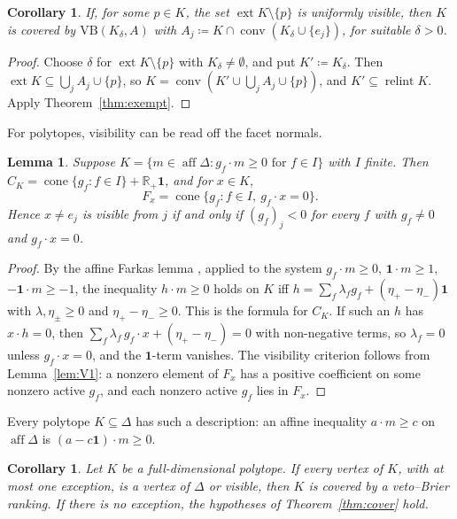 \documentclass[11pt]{article}
\newcommand{\R}{\mathbb{R}}
\newcommand{\one}{\mathbf{1}}
\newcommand{\VB}{\mathrm{VB}}
\DeclareMathOperator{\conv}{conv}
\DeclareMathOperator{\cone}{cone}
\DeclareMathOperator{\relint}{relint}
\DeclareMathOperator{\aff}{aff}
\DeclareMathOperator{\ext}{ext}
\theoremstyle{plain}
\newtheorem{lemma}[theorem]{Lemma}
\newtheorem{corollary}[theorem]{Corollary}
\theoremstyle{definition}
\theoremstyle{remark}
\begin{document}
\begin{corollary}\label{cor:exemptvis}
If, for some $p\in K$, the set $\ext K\setminus\{p\}$ is uniformly visible, then $K$ is
covered by $\VB(K_\delta,A)$ with $A_j\coloneqq K\cap\conv(K_\delta\cup\{e_j\})$, for
suitable $\delta>0$.
\end{corollary}

\begin{proof}
Choose $\delta$ for $\ext K\setminus\{p\}$ with $K_\delta\neq\emptyset$, and put
$K'\coloneqq K_\delta$. Then $\ext K\subseteq\bigcup_jA_j\cup\{p\}$, so
$K=\conv(K'\cup\bigcup_jA_j\cup\{p\})$, and $K'\subseteq\relint K$. Apply
Theorem~\ref{thm:exempt}.
\end{proof}

For polytopes, visibility can be read off the facet normals.

\begin{lemma}\label{lem:poly}
Suppose $K=\{m\in\aff\Delta:g_f\cdot m\ge0\text{ for }f\in I\}$ with $I$ finite. Then
$C_K=\cone\{g_f:f\in I\}+\R_+\one$, and for $x\in K$,
\[
  F_x=\cone\{g_f:f\in I,\ g_f\cdot x=0\}.
\]
Hence $x\neq e_j$ is visible from $j$ if and only if $(g_f)_j<0$ for every $f$ with
$g_f\neq0$ and $g_f\cdot x=0$.
\end{lemma}

\begin{proof}
By the affine Farkas lemma \cite[Cor.~7.1h]{Schrijver}, applied to the system $g_f\cdot
m\ge0$, $\one\cdot m\ge1$, $-\one\cdot m\ge-1$, the inequality $h\cdot m\ge0$ holds on
$K$ iff $h=\sum_f\lambda_fg_f+(\eta_+-\eta_-)\one$ with $\lambda,\eta_\pm\ge0$ and
$\eta_+-\eta_-\ge0$. This is the formula for $C_K$. If such an $h$ has $x\cdot h=0$, then
$\sum_f\lambda_f\,g_f\cdot x+(\eta_+-\eta_-)=0$ with non-negative terms, so $\lambda_f=0$
unless $g_f\cdot x=0$, and the $\one$-term vanishes. The visibility criterion follows from
Lemma~\ref{lem:V1}: a nonzero element of $F_x$ has a positive coefficient on some nonzero
active $g_f$, and each nonzero active $g_f$ lies in $F_x$.
\end{proof}

Every polytope $K\subseteq\Delta$ has such a description: an affine inequality $a\cdot
m\ge c$ on $\aff\Delta$ is $(a-c\one)\cdot m\ge0$.

\begin{corollary}\label{cor:poly}
Let $K$ be a full-dimensional polytope. If every vertex of $K$, with at most one
exception, is a vertex of $\Delta$ or visible, then $K$ is covered by a veto--Brier
ranking. If there is no exception, the hypotheses of Theorem~\ref{thm:cover} hold.
\end{corollary}
\end{document}
